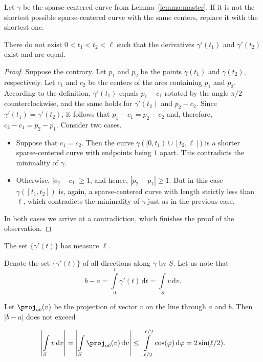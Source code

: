 Let $\gamma$ be the sparse-centered curve from Lemma~\ref{lemma:master}. If it is not the shortest possible sparse-centered curve with the same centers, replace it with the shortest one.

\begin{observation}
There do not exist $0 < t_1 < t_2 < \ell$ such that the derivatives $\gamma'(t_1)$ and $\gamma'(t_2)$ exist and are equal.
\end{observation}

\begin{proof}
Suppose the contrary. Let $p_1$ and $p_2$ be the points $\gamma(t_1)$ and $\gamma(t_2)$, respectively. Let $c_1$ and $c_2$ be the centers of the arcs containing $p_1$ and $p_2$. According to the definition, $\gamma'(t_1)$ equals $p_1 - c_1$ rotated by the angle $\pi/2$ counterclockwise, and the same holds for $\gamma'(t_2)$ and $p_2 - c_2$. Since $\gamma'(t_1) = \gamma'(t_2)$, it follows that $p_1 - c_1 = p_2 - c_2$ and, therefore, $c_2 - c_1 = p_2 - p_1$. Consider two cases.

\begin{itemize}
    \item Suppose that $c_1 = c_2$. Then the curve $\gamma([0, t_1)\cup[t_2, \ell])$ is a shorter sparse-centered curve with endpoints being $1$ apart. This contradicts the minimality of $\gamma$.
    
    \item Otherwise, $|c_2 - c_1| \geq 1$, and hence, $|p_2 - p_1|\geq 1$. But in this case $\gamma([t_1, t_2])$ is, again, a sparse-centered curve with length strictly less than $\ell$, which contradicts the minimality of $\gamma$ just as in the previous case.
\end{itemize}

In both cases we arrive at a contradiction, which finishes the proof of the observation.
\end{proof}

\begin{corollary}
The set $\{\gamma'(t)\}$ has measure $\ell$.
\end{corollary}

Denote the set $\{\gamma'(t)\}$ of all directions along $\gamma$ by $S$. Let us note that $$b - a = \int\limits_0^{\ell}\gamma'(t)\,\mathrm{d}t = \int\limits_Sv\,\mathrm{d}v.$$

Let $\proj_{ab}(v)$ be the projection of vector $v$ on the line through $a$ and $b$. Then $|b - a|$ does not exceed

$$\left|\int\limits_Sv\,\mathrm{d}v\right| = \left|\int\limits_S\proj_{ab}(v)\,\mathrm{d}v\right| \leq \int\limits_{-\ell/2}^{\ell/2}\cos(\varphi)\,\mathrm{d}\varphi = 2\sin(\ell/2).$$

